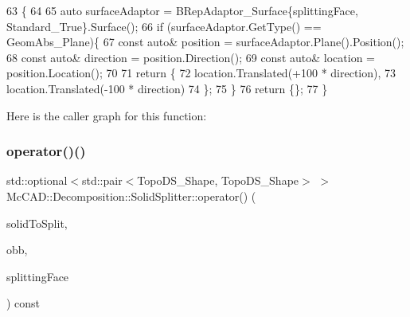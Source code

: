 \begin{DoxyCode}
63                                                \{
64 
65     \textcolor{keyword}{auto} surfaceAdaptor = BRepAdaptor\_Surface\{splittingFace, Standard\_True\}.Surface();
66     \textcolor{keywordflow}{if} (surfaceAdaptor.GetType() == GeomAbs\_Plane)\{
67         \textcolor{keyword}{const} \textcolor{keyword}{auto}& position = surfaceAdaptor.Plane().Position();
68         \textcolor{keyword}{const} \textcolor{keyword}{auto}& direction = position.Direction();
69         \textcolor{keyword}{const} \textcolor{keyword}{auto}& location = position.Location();
70 
71         \textcolor{keywordflow}{return} \{
72             location.Translated(+100 * direction),
73             location.Translated(-100 * direction)
74         \};
75     \}
76     \textcolor{keywordflow}{return} \{\};
77 \}
\end{DoxyCode}
Here is the caller graph for this function\+:
\mbox{\label{classMcCAD_1_1Decomposition_1_1SolidSplitter_a34b6260bdc707b7cde534dda0572eb69}} 
\subsubsection{\texorpdfstring{operator()()}{operator()()}\hspace{0.1cm}{\footnotesize\ttfamily [1/2]}}
{\footnotesize\ttfamily std\+::optional$<$std\+::pair$<$Topo\+D\+S\+\_\+\+Shape, Topo\+D\+S\+\_\+\+Shape$>$ $>$ Mc\+C\+A\+D\+::\+Decomposition\+::\+Solid\+Splitter\+::operator() (\begin{DoxyParamCaption}\item[{const Topo\+D\+S\+\_\+\+Solid \&}]{solid\+To\+Split,  }\item[{const Bnd\+\_\+\+O\+BB \&}]{obb,  }\item[{const Topo\+D\+S\+\_\+\+Face \&}]{splitting\+Face }\end{DoxyParamCaption}) const}

\mbox{\label{classMcCAD_1_1Decomposition_1_1SolidSplitter_a9c6cda3267256f5bf28ff4a007226499}} 
